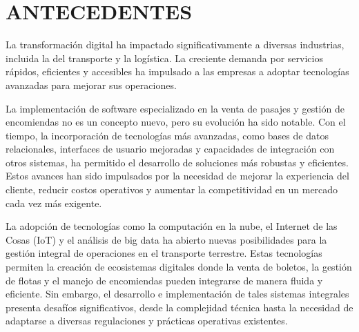 \section{ANTECEDENTES}

	La transformación digital ha impactado significativamente a diversas industrias, incluida la del transporte y la logística. La creciente demanda por servicios rápidos, eficientes y accesibles ha impulsado a las empresas a adoptar tecnologías avanzadas para mejorar sus operaciones.
	
	La implementación de software especializado en la venta de pasajes y gestión de encomiendas no es un concepto nuevo, pero su evolución ha sido notable. Con el tiempo, la incorporación de tecnologías más avanzadas, como bases de datos relacionales, interfaces de usuario mejoradas y capacidades de integración con otros sistemas, ha permitido el desarrollo de soluciones más robustas y eficientes. Estos avances han sido impulsados por la necesidad de mejorar la experiencia del cliente, reducir costos operativos y aumentar la competitividad en un mercado cada vez más exigente.
		
	
	La adopción de tecnologías como la computación en la nube, el Internet de las Cosas (IoT) y el análisis de big data ha abierto nuevas posibilidades para la gestión integral de operaciones en el transporte terrestre. Estas tecnologías permiten la creación de ecosistemas digitales donde la venta de boletos, la gestión de flotas y el manejo de encomiendas pueden integrarse de manera fluida y eficiente. Sin embargo, el desarrollo e implementación de tales sistemas integrales presenta desafíos significativos, desde la complejidad técnica hasta la necesidad de adaptarse a diversas regulaciones y prácticas operativas existentes.
	
